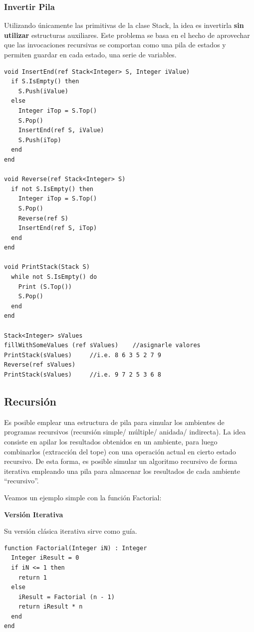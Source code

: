 \subsubsection{Invertir Pila}

Utilizando únicamente las primitivas de la clase Stack, la idea es invertirla \textbf{sin utilizar} estructuras auxiliares. Este problema se basa en el hecho de aprovechar que las invocaciones recursivas se comportan como una pila de estados y permiten guardar en cada estado, una serie de variables.

\begin{lstlisting}[upquote=true, language=pseudo]
void InsertEnd(ref Stack<Integer> S, Integer iValue)
  if S.IsEmpty() then
    S.Push(iValue)
  else
    Integer iTop = S.Top()
    S.Pop()
    InsertEnd(ref S, iValue)
    S.Push(iTop)
  end
end

void Reverse(ref Stack<Integer> S)
  if not S.IsEmpty() then
    Integer iTop = S.Top()
    S.Pop()
    Reverse(ref S)
    InsertEnd(ref S, iTop)
  end
end

void PrintStack(Stack S)
  while not S.IsEmpty() do
    Print (S.Top())
    S.Pop()
  end
end

Stack<Integer> sValues
fillWithSomeValues (ref sValues)	//asignarle valores
PrintStack(sValues)		//i.e. 8 6 3 5 2 7 9
Reverse(ref sValues)
PrintStack(sValues)		//i.e. 9 7 2 5 3 6 8
\end{lstlisting}

\subsection{Recursión} \label{sec:recstack}

Es posible emplear una estructura de pila para simular los ambientes de programas recursivos (recursión simple/ múltiple/ anidada/ indirecta). La idea consiste en apilar los resultados obtenidos en un ambiente, para luego combinarlos (extracción del tope) con una operación actual en cierto estado recursivo. De esta forma, es posible simular un algoritmo recursivo de forma iterativa empleando una pila para almacenar los resultados de cada ambiente “recursivo”.

Veamos un ejemplo simple con la función Factorial:

\textbf{Versión Iterativa}

Su versión clásica iterativa sirve como guía.

\begin{lstlisting}[upquote=true, language=pseudo]
function Factorial(Integer iN) : Integer
  Integer iResult = 0
  if iN <= 1 then
    return 1
  else
    iResult = Factorial (n - 1)
    return iResult * n
  end
end
\end{lstlisting}


